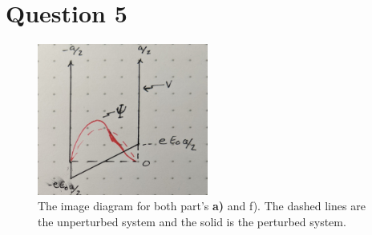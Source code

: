 \documentclass[11pt]{article}
\begin{document}
\section*{Question 5}

\begin{figure}[!ht]
\centering
	\includegraphics[width=0.5\textwidth]{phsx462_hw02_01.jpg}
	\caption{The image diagram for both part's {\bf a)} and {f)}. The dashed lines are the unperturbed system and the solid is the perturbed system.}
	\label{fig:5.1}
\end{figure}
\end{document}

